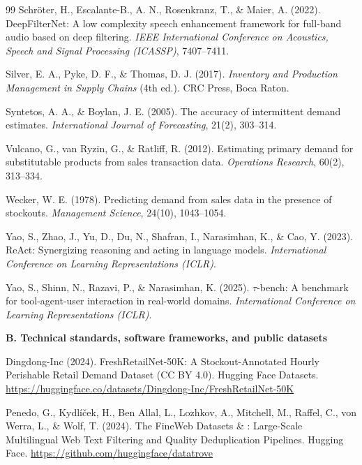 \begin{thebibliography}{99}
Schr\"oter, H., Escalante-B., A. N., Rosenkranz, T., \& Maier, A. (2022).
DeepFilterNet: A low complexity speech enhancement framework for full-band audio based on deep filtering.
\textit{IEEE International Conference on Acoustics, Speech and Signal Processing (ICASSP)}, 7407--7411.

Silver, E. A., Pyke, D. F., \& Thomas, D. J. (2017).
\textit{Inventory and Production Management in Supply Chains} (4th ed.).
CRC Press, Boca Raton.

Syntetos, A. A., \& Boylan, J. E. (2005).
The accuracy of intermittent demand estimates.
\textit{International Journal of Forecasting}, 21(2), 303--314.

Vulcano, G., van Ryzin, G., \& Ratliff, R. (2012).
Estimating primary demand for substitutable products from sales transaction data.
\textit{Operations Research}, 60(2), 313--334.

Wecker, W. E. (1978).
Predicting demand from sales data in the presence of stockouts.
\textit{Management Science}, 24(10), 1043--1054.

Yao, S., Zhao, J., Yu, D., Du, N., Shafran, I., Narasimhan, K., \& Cao, Y. (2023).
ReAct: Synergizing reasoning and acting in language models.
\textit{International Conference on Learning Representations (ICLR)}.

Yao, S., Shinn, N., Razavi, P., \& Narasimhan, K. (2025).
$\tau$-bench: A benchmark for tool-agent-user interaction in real-world domains.
\textit{International Conference on Learning Representations (ICLR)}.

\item[]\hspace*{-\leftmargin}\textbf{B. Technical standards, software frameworks, and public datasets}

Dingdong-Inc (2024).
FreshRetailNet-50K: A Stockout-Annotated Hourly Perishable Retail Demand Dataset (CC BY 4.0).
Hugging Face Datasets. \url{https://huggingface.co/datasets/Dingdong-Inc/FreshRetailNet-50K}

Penedo, G., Kydl\'i\v{c}ek, H., Ben Allal, L., Lozhkov, A., Mitchell, M., Raffel, C., von Werra, L., \& Wolf, T. (2024).
The FineWeb Datasets \& : Large-Scale Multilingual Web Text Filtering and Quality Deduplication Pipelines.
Hugging Face. \url{https://github.com/huggingface/datatrove}


\end{thebibliography}
